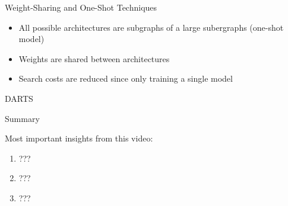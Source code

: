 \documentclass[main]{subfiles}
\begin{document}
\begin{frame}{Weight-Sharing and One-Shot Techniques}
\begin{itemize}
    \item All possible architectures are subgraphs of a large subergraphs (one-shot model)
    \item Weights are shared between architectures
    \item Search costs are reduced since only training a single model

\end{itemize}
\end{frame}

\begin{frame}{DARTS}
    
\end{frame}
\begin{frame}{Summary} 

Most important insights from this video:

\begin{enumerate}
    \item ???
    \item ???
    \item ???
\end{enumerate}


\end{frame}
\end{document}
